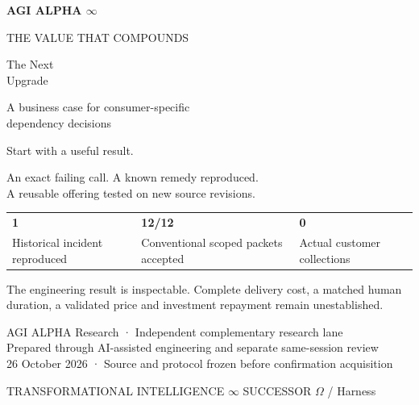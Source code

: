 \documentclass[11pt,letterpaper]{article}
\newcommand{\ConvAccepted}{12}
\begin{document}
\begin{titlepage}
\thispagestyle{empty}
\color{white}
{\sffamily\bfseries\large AGI ALPHA $\infty$\par}
\vspace{0.2in}
{\sffamily\small\color{gold} THE VALUE THAT COMPOUNDS\par}
\vspace{0.65in}
{\fontsize{48}{52}\selectfont The Next\\Upgrade\par}
\vspace{0.24in}
{\Large A business case for consumer-specific\\dependency decisions\par}
\vspace{0.5in}
{\large\color{gold} Start with a useful result.\par}
{\large An exact failing call. A known remedy reproduced.\\A reusable offering tested on new source revisions.\par}
\vspace{0.55in}
\begin{tabularx}{\textwidth}{@{}YYY@{}}
{\sffamily\bfseries\LARGE 1} & {\sffamily\bfseries\LARGE \ConvAccepted/12} & {\sffamily\bfseries\LARGE 0}\\
Historical incident reproduced & Conventional scoped packets accepted & Actual customer collections\\
\end{tabularx}
\par\vspace{0.35in}
{\normalsize The engineering result is inspectable. Complete delivery cost, a matched human duration, a validated price and investment repayment remain unestablished.\par}
\vfill
{\small\sffamily AGI ALPHA Research · Independent complementary research lane\\
Prepared through AI-assisted engineering and separate same-session review\\
26 October 2026 · Source and protocol frozen before confirmation acquisition\par}
\vspace{0.2in}
{\footnotesize\color{gold} TRANSFORMATIONAL INTELLIGENCE $\infty$ \quad SUCCESSOR $\Omega$ / Harness\par}
\end{titlepage}
\end{document}

